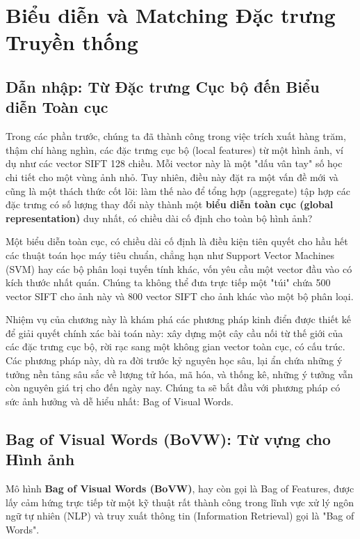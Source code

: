 \section{Biểu diễn và Matching Đặc trưng Truyền thống}
\label{sec:feature_representation_and_matching}

\subsection{Dẫn nhập: Từ Đặc trưng Cục bộ đến Biểu diễn Toàn cục}
\label{subsec:local_to_global_representation}

Trong các phần trước, chúng ta đã thành công trong việc trích xuất hàng trăm, thậm chí hàng nghìn, các đặc trưng cục bộ (local features) từ một hình ảnh, ví dụ như các vector SIFT 128 chiều. Mỗi vector này là một "dấu vân tay" số học chi tiết cho một vùng ảnh nhỏ. Tuy nhiên, điều này đặt ra một vấn đề mới và cũng là một thách thức cốt lõi: làm thế nào để tổng hợp (aggregate) tập hợp các đặc trưng có số lượng thay đổi này thành một \textbf{biểu diễn toàn cục (global representation)} duy nhất, có chiều dài cố định cho toàn bộ hình ảnh?

Một biểu diễn toàn cục, có chiều dài cố định là điều kiện tiên quyết cho hầu hết các thuật toán học máy tiêu chuẩn, chẳng hạn như Support Vector Machines (SVM) hay các bộ phân loại tuyến tính khác, vốn yêu cầu một vector đầu vào có kích thước nhất quán. Chúng ta không thể đưa trực tiếp một "túi" chứa 500 vector SIFT cho ảnh này và 800 vector SIFT cho ảnh khác vào một bộ phân loại.

Nhiệm vụ của chương này là khám phá các phương pháp kinh điển được thiết kế để giải quyết chính xác bài toán này: xây dựng một cây cầu nối từ thế giới của các đặc trưng cục bộ, rời rạc sang một không gian vector toàn cục, có cấu trúc. Các phương pháp này, dù ra đời trước kỷ nguyên học sâu, lại ẩn chứa những ý tưởng nền tảng sâu sắc về lượng tử hóa, mã hóa, và thống kê, những ý tưởng vẫn còn nguyên giá trị cho đến ngày nay. Chúng ta sẽ bắt đầu với phương pháp có sức ảnh hưởng và dễ hiểu nhất: Bag of Visual Words.

\subsection{Bag of Visual Words (BoVW): Từ vựng cho Hình ảnh}
\label{subsec:bovw}

Mô hình \textbf{Bag of Visual Words (BoVW)}, hay còn gọi là Bag of Features, được lấy cảm hứng trực tiếp từ một kỹ thuật rất thành công trong lĩnh vực xử lý ngôn ngữ tự nhiên (NLP) và truy xuất thông tin (Information Retrieval) gọi là "Bag of Words".

